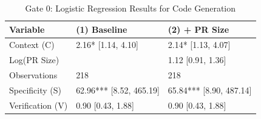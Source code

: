 \begin{table}
\caption{Gate 0: Logistic Regression Results for Code Generation}
\label{tab:gate0}
\begin{tabular}{lll}
\toprule
Variable & (1) Baseline & (2) + PR Size \\
\midrule
Context (C) & 2.16* [1.14, 4.10] & 2.14* [1.13, 4.07] \\
Log(PR Size) &  & 1.12 [0.91, 1.36] \\
Observations & 218 & 218 \\
Specificity (S) & 62.96*** [8.52, 465.19] & 65.84*** [8.90, 487.14] \\
Verification (V) & 0.90 [0.43, 1.88] & 0.90 [0.43, 1.88] \\
\bottomrule
\end{tabular}
\end{table}

